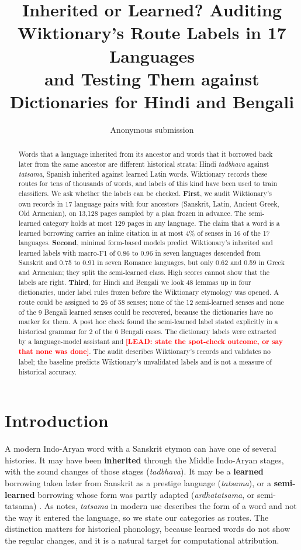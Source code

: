 \documentclass[11pt]{article}
\title{Inherited or Learned? Auditing Wiktionary's Route Labels in 17 Languages\\and Testing Them against Dictionaries for Hindi and Bengali}
\author{Anonymous submission}
\newcommand{\lead}[1]{\textcolor{red}{\textbf{[LEAD: #1]}}}
\begin{document}
\maketitle

\begin{abstract}
Words that a language inherited from its ancestor and words that it borrowed back later from the same ancestor are different historical strata: Hindi \textit{tadbhava} against \textit{tatsama}, Spanish inherited against learned Latin words. Wiktionary records these routes for tens of thousands of words, and labels of this kind have been used to train classifiers. We ask whether the labels can be checked. \textbf{First}, we audit Wiktionary's own records in 17 language pairs with four ancestors (Sanskrit, Latin, Ancient Greek, Old Armenian), on 13,128 pages sampled by a plan frozen in advance. The semi-learned category holds at most 129 pages in any language. The claim that a word is a learned borrowing carries an inline citation in at most 4\% of senses in 16 of the 17 languages. \textbf{Second}, minimal form-based models predict Wiktionary's inherited and learned labels with macro-F1 of 0.86 to 0.96 in seven languages descended from Sanskrit and 0.75 to 0.91 in seven Romance languages, but only 0.62 and 0.59 in Greek and Armenian; they split the semi-learned class. High scores cannot show that the labels are right. \textbf{Third}, for Hindi and Bengali we look 48 lemmas up in four dictionaries, under label rules frozen before the Wiktionary etymology was opened. A route could be assigned to 26 of 58 senses; none of the 12 semi-learned senses and none of the 9 Bengali learned senses could be recovered, because the dictionaries have no marker for them. A post hoc check found the semi-learned label stated explicitly in a historical grammar for 2 of the 6 Bengali cases. The dictionary labels were extracted by a language-model assistant and \lead{state the spot-check outcome, or say that none was done}. The audit describes Wiktionary's records and validates no label; the baseline predicts Wiktionary's unvalidated labels and is not a measure of historical accuracy.
\end{abstract}

\section{Introduction}

A modern Indo-Aryan word with a Sanskrit etymon can have one of several histories. It may have been \textbf{inherited} through the Middle Indo-Aryan stages, with the sound changes of those stages (\textit{tadbhava}). It may be a \textbf{learned} borrowing taken later from Sanskrit as a prestige language (\textit{tatsama}), or a \textbf{semi-learned} borrowing whose form was partly adapted (\textit{ardhatatsama}, or semi-tatsama) \citep[\S111]{chatterji1926}. As \citeauthor{chatterji1926} notes, \textit{tatsama} in modern use describes the form of a word and not the way it entered the language, so we state our categories as routes. The distinction matters for historical phonology, because learned words do not show the regular changes, and it is a natural target for computational attribution.
\end{document}
